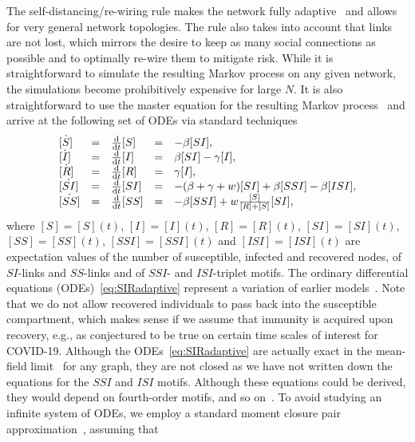 \documentclass[12pt]{article}
\def\txtd{{\textnormal{d}}}
\begin{document}
The self-distancing/re-wiring rule makes the network fully adaptive~\cite{GrossSayama} and allows for very general network topologies. The rule also takes into account that links are not lost, which mirrors the desire to keep as many social connections as possible and to optimally re-wire them to mitigate risk. While it is straightforward to simulate the resulting Markov process on any given network, the simulations become prohibitively expensive for large $N$. It is also straightforward to use the master equation for the resulting Markov process~\cite{Norris} and arrive at the following set of ODEs via standard techniques~\cite{KissMillerSimon}
\begin{equation}
\label{eq:SIRadaptive}
    \begin{array}{lclcl}
 \dot{[S]}&=&\frac{\txtd }{\txtd t} [S]
 &=&
 -\beta [SI],
 \\
 \dot{[I]}&=&\frac{\txtd }{\txtd t} [I]
 &=&
 \beta [SI] - \gamma [I],
 \\
 \dot{[R]}&=&\frac{\txtd }{\txtd t} [R]
 &=&
\gamma [I],
 \\
\dot{[SI]}&=& \frac{\txtd }{\txtd t} [SI]
 &=&
 -(\beta+\gamma+w)[SI] + \beta[SSI] -\beta[ISI], 
 \\
 \dot{[SS]}&=&\frac{\txtd }{\txtd t} [SS]
 &=&
- \beta [SSI] + w\frac{[S]}{[R]+[S]} [SI],
\end{array}
\end{equation}
where $[S]=[S](t)$, $[I]=[I](t)$, $[R]=[R](t)$, $[SI]=[SI](t)$, $[SS]=[SS](t)$, $[SSI]=[SSI](t)$ and $[ISI]=[ISI](t)$ are expectation values of the number of susceptible, infected and recovered nodes, of $SI$-links and $SS$-links and of $SSI$- and $ISI$-triplet motifs. The ordinary differential equations (ODEs)~\eqref{eq:SIRadaptive} represent a variation of earlier models~\cite{ShawSchwartz,GrossDLimaBlasius}. Note that we do not allow recovered individuals to pass back into the susceptible compartment, which makes sense if we assume that immunity is acquired upon recovery, e.g., as conjectured to be true on certain time scales of interest for COVID-19. Although the ODEs~\eqref{eq:SIRadaptive} are actually exact in the mean-field limit~\cite{KissMillerSimon} for any graph, they are not closed as we have not written down the equations for the $SSI$ and $ISI$ motifs. Although these equations could be derived, they would depend on fourth-order motifs, and so on~\cite{KuehnMC,HouseKeeling}. To avoid studying an infinite system of ODEs, we employ a standard moment closure pair approximation~\cite{KeelingRandMorris,Keeling,KissMillerSimon,GrossDLimaBlasius}, assuming that 
\end{document}
